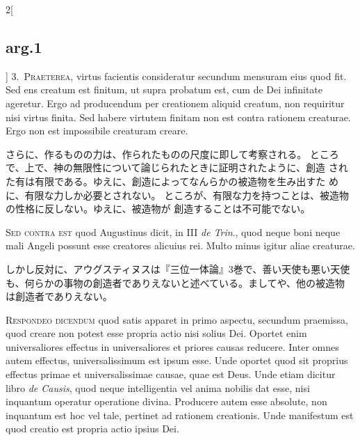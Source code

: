 \documentclass[paper=a4paper,fontsize=10pt,jafontsize=9pt,titlepage]{jlreq}
\begin{document}
\begin{paracol}{2}[\subsection{arg.1}]
3.~{\scshape Praeterea}, virtus facientis consideratur
 secundum mensuram eius quod fit. Sed ens creatum est finitum, ut supra
 probatum est, cum de Dei infinitate ageretur. Ergo ad producendum per
 creationem aliquid creatum, non requiritur nisi virtus finita. Sed
 habere virtutem finitam non est contra rationem creaturae. Ergo non est
 impossibile creaturam creare.

\switchcolumn

さらに、作るものの力は、作られたものの尺度に即して考察される。
ところで、上で、神の無限性について論じられたときに証明されたように、創造
 された有は有限である。ゆえに、創造によってなんらかの被造物を生み出すた
 めに、有限な力しか必要とされない。
ところが、有限な力を持つことは、被造物の性格に反しない。ゆえに、被造物が
 創造することは不可能でない。

\switchcolumn*[\subsection{s.c.}]

{\scshape Sed contra est} quod Augustinus dicit, in III
 {\itshape de Trin}., quod neque boni neque mali Angeli possunt esse creatores
 alicuius rei. Multo minus igitur aliae creaturae.

\switchcolumn

しかし反対に、アウグスティヌスは『三位一体論』3巻で、善い天使も悪い天使
 も、何らかの事物の創造者でありえないと述べている。ましてや、他の被造物
 は創造者でありえない。


{\scshape Respondeo dicendum} quod satis apparet in primo
 aspectu, secundum praemissa, quod creare non potest esse propria actio
 nisi solius Dei. Oportet enim universaliores effectus in universaliores
 et priores causas reducere. Inter omnes autem effectus,
 universalissimum est ipsum esse. Unde oportet quod sit proprius
 effectus primae et universalissimae causae, quae est Deus. Unde etiam
 dicitur libro {\itshape de Causis}, quod neque intelligentia vel anima nobilis dat
 esse, nisi inquantum operatur operatione divina. Producere autem esse
 absolute, non inquantum est hoc vel tale, pertinet ad rationem
 creationis. Unde manifestum est quod creatio est propria actio ipsius
 Dei.

\switchcolumn


\end{paracol}
\end{document}
